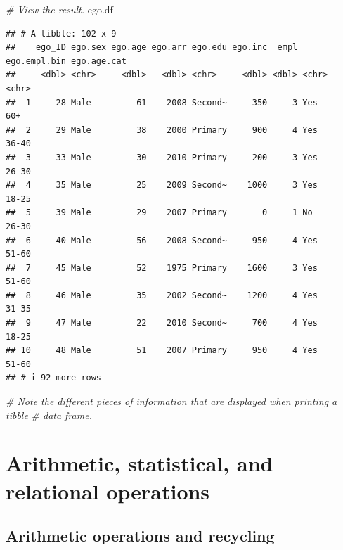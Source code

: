 \documentclass[
]{book}
\newenvironment{Shaded}{\begin{snugshade}}{\end{snugshade}}
\newcommand{\CommentTok}[1]{\textcolor[rgb]{0.56,0.35,0.01}{\textit{#1}}}
\newcommand{\NormalTok}[1]{#1}
\begin{document}
\begin{Shaded}
\begin{Highlighting}[]
\CommentTok{\# View the result.}
\NormalTok{ego.df}
\end{Highlighting}
\end{Shaded}

\begin{verbatim}
## # A tibble: 102 x 9
##    ego_ID ego.sex ego.age ego.arr ego.edu ego.inc  empl ego.empl.bin ego.age.cat
##     <dbl> <chr>     <dbl>   <dbl> <chr>     <dbl> <dbl> <chr>        <chr>      
##  1     28 Male         61    2008 Second~     350     3 Yes          60+        
##  2     29 Male         38    2000 Primary     900     4 Yes          36-40      
##  3     33 Male         30    2010 Primary     200     3 Yes          26-30      
##  4     35 Male         25    2009 Second~    1000     3 Yes          18-25      
##  5     39 Male         29    2007 Primary       0     1 No           26-30      
##  6     40 Male         56    2008 Second~     950     4 Yes          51-60      
##  7     45 Male         52    1975 Primary    1600     3 Yes          51-60      
##  8     46 Male         35    2002 Second~    1200     4 Yes          31-35      
##  9     47 Male         22    2010 Second~     700     4 Yes          18-25      
## 10     48 Male         51    2007 Primary     950     4 Yes          51-60      
## # i 92 more rows
\end{verbatim}

\begin{Shaded}
\begin{Highlighting}[]
\CommentTok{\# Note the different pieces of information that are displayed when printing a tibble}
\CommentTok{\# data frame.}
\end{Highlighting}
\end{Shaded}

\hypertarget{arithmetic-statistical-and-relational-operations}{%
\section{Arithmetic, statistical, and relational operations}\label{arithmetic-statistical-and-relational-operations}}

\hypertarget{arithmetic-operations-and-recycling}{%
\subsection{Arithmetic operations and recycling}\label{arithmetic-operations-and-recycling}}
\end{document}
